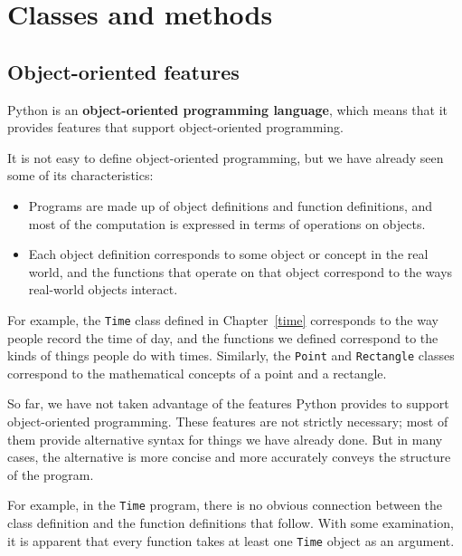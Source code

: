 \documentclass[10pt]{book}
\begin{document}
\chapter{Classes and methods}


\section{Object-oriented features}


Python is an {\bf object-oriented programming language}, which means
that it provides features that support object-oriented
programming.

It is not easy to define object-oriented programming, but we have
already seen some of its characteristics:

\begin{itemize}

\item Programs are made up of object definitions and function
definitions, and most of the computation is expressed in terms
of operations on objects.

\item Each object definition corresponds to some object or concept
in the real world, and the functions that operate on that object
correspond to the ways real-world objects interact.

\end{itemize}

For example, the {\tt Time} class defined in Chapter~\ref{time}
corresponds to the way people record the time of day, and the
functions we defined correspond to the kinds of things people do with
times.  Similarly, the {\tt Point} and {\tt Rectangle} classes
correspond to the mathematical concepts of a point and a rectangle.

So far, we have not taken advantage of the features Python provides to
support object-oriented programming.  These
features are not strictly necessary; most of them provide
alternative syntax for things we have already done.  But in many cases,
the alternative is more concise and more accurately conveys the
structure of the program.

For example, in the {\tt Time} program, there is no obvious
connection between the class definition and the function definitions
that follow.  With some examination, it is apparent that every function
takes at least one {\tt Time} object as an argument.
\end{document}
